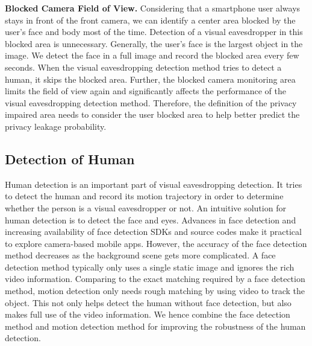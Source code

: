 \textbf{Blocked Camera Field of View.}
  Considering that a smartphone user always stays in front of the front camera, we can identify a center area  blocked by the user's face and body most of the time. Detection of a visual eavesdropper in this blocked area is unnecessary. Generally, the user's face  is the largest object in the image. We detect the face in a full image and record the blocked area every few seconds.  When the visual eavesdropping detection method tries to detect a human, it  skips the blocked area. Further, the blocked camera monitoring area limits the field of view again and significantly affects the performance of the visual eavesdropping detection method.  Therefore, the definition of the privacy impaired area needs to consider the user blocked area to help better predict the privacy leakage probability.



\subsection{Detection of Human}
Human detection is an important part of visual eavesdropping detection. It tries to detect the human and record its motion trajectory in order to  determine whether the person is a visual eavesdropper or not.  An intuitive solution for  human detection is to detect the face and eyes. Advances in face detection and increasing availability of face detection SDKs and source codes make it practical to explore camera-based mobile apps. However, the accuracy of the face detection method decreases as the background scene gets more complicated.  A face detection method typically only uses a single static image and ignores the rich video information. Comparing to the exact matching required by a face detection method, motion detection only needs rough matching by using video to track the object.  This not only helps detect the human without  face detection, but also makes full use of the video information. We hence combine the face detection method and motion detection method for improving the robustness of the human detection.




